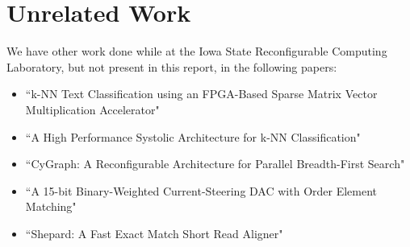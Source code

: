 \section{Unrelated Work}
We have other work done while at the Iowa State Reconfigurable Computing Laboratory, but not present in this report, in the following papers:
\begin{itemize}
    \item ``k-NN Text Classification using an FPGA-Based Sparse Matrix Vector Multiplication Accelerator" \cite{prelim:townsend4}
    \item ``A High Performance Systolic Architecture for k-NN Classification" \cite{prelim:townsend2}
    \item ``CyGraph: A Reconfigurable Architecture for Parallel Breadth-First Search" \cite{prelim:attia}
    \item ``A 15-bit Binary-Weighted Current-Steering DAC with Order Element Matching" \cite{prelim:zeng}
    \item ``Shepard: A Fast Exact Match Short Read Aligner" \cite{prelim:nelson}
\end{itemize}
